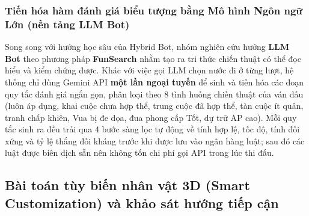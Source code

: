 \subsubsection{Tiến hóa hàm đánh giá biểu tượng bằng Mô hình Ngôn ngữ Lớn (nền tảng LLM Bot)}
Song song với hướng học sâu của Hybrid Bot, nhóm nghiên cứu hướng \textbf{LLM Bot} theo phương pháp \textbf{FunSearch} \cite{funsearch} nhằm tạo ra tri thức chiến thuật có thể đọc hiểu và kiểm chứng được. Khác với việc gọi LLM chọn nước đi ở từng lượt, hệ thống chỉ dùng Gemini API \textbf{một lần ngoại tuyến} để sinh và tiến hóa các đoạn quy tắc đánh giá ngắn gọn, phân loại theo 8 tình huống chiến thuật của ván đấu (luôn áp dụng, khai cuộc chưa hợp thể, trung cuộc đã hợp thể, tàn cuộc ít quân, tranh chấp khiên, Vua bị đe dọa, đua phong cấp Tốt, dự trữ AP cao). Mỗi quy tắc sinh ra đều trải qua 4 bước sàng lọc tự động về tính hợp lệ, tốc độ, tính đối xứng và tỷ lệ thắng đối kháng trước khi được lưu vào ngân hàng luật; sau đó các luật được biên dịch sẵn nên không tốn chi phí gọi API trong lúc thi đấu.

\subsection{Bài toán tùy biến nhân vật 3D (Smart Customization) và khảo sát hướng tiếp cận}

